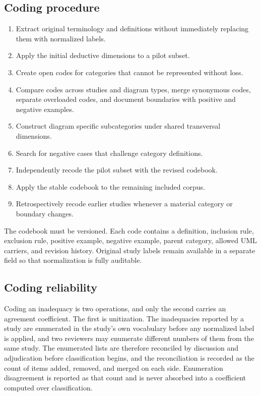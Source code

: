 \subsection{Coding procedure}

\begin{enumerate}[label=\arabic*)]
    \item Extract original terminology and definitions without immediately replacing them with normalized labels.
    \item Apply the initial deductive dimensions to a pilot subset.
    \item Create open codes for categories that cannot be represented without loss.
    \item Compare codes across studies and diagram types, merge synonymous codes, separate overloaded codes, and document boundaries with positive and negative examples.
    \item Construct diagram specific subcategories under shared transversal dimensions.
    \item Search for negative cases that challenge category definitions.
    \item Independently recode the pilot subset with the revised codebook.
    \item Apply the stable codebook to the remaining included corpus.
    \item Retrospectively recode earlier studies whenever a material category or boundary changes.
\end{enumerate}

The codebook must be versioned. Each code contains a definition, inclusion rule, exclusion rule, positive example, negative example, parent category, allowed UML carriers, and revision history. Original study labels remain available in a separate field so that normalization is fully auditable.

\subsection{Coding reliability}

Coding an inadequacy is two operations, and only the second carries an agreement coefficient. The first is unitization. The inadequacies reported by a study are enumerated in the study's own vocabulary before any normalized label is applied, and two reviewers may enumerate different numbers of them from the same study. The enumerated lists are therefore reconciled by discussion and adjudication before classification begins, and the reconciliation is recorded as the count of items added, removed, and merged on each side. Enumeration disagreement is reported as that count and is never absorbed into a coefficient computed over classification.

